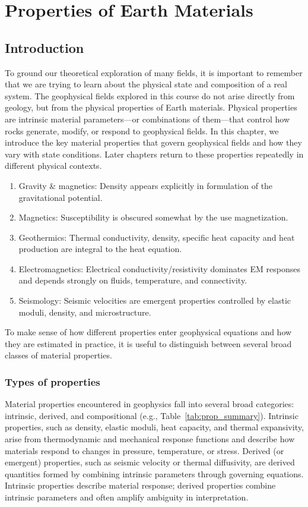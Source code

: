 \chapter{Properties of Earth Materials}\label{ch:physprop}

\section{Introduction}
To ground our theoretical exploration of many fields, it is important to remember that we are trying to learn about the physical state and composition of a real system.  The geophysical fields explored in this course do not arise directly from geology, but from the physical properties of Earth materials.  Physical properties are intrinsic material parameters---or combinations of them---that control how rocks generate, modify, or respond to geophysical fields.  In this chapter, we introduce the key material properties that govern geophysical fields and how they vary with state conditions. Later chapters return to these properties repeatedly in different physical contexts.

\begin{enumerate}
    \item Gravity \& magnetics: Density appears explicitly in formulation of the gravitational potential.
    \item Magnetics: Susceptibility is obscured somewhat by the use magnetization.
    \item Geothermics: Thermal conductivity, density, specific heat capacity and heat production are integral to the heat equation.
    \item Electromagnetics: Electrical conductivity/resistivity dominates EM responses and depends strongly on fluids, temperature, and connectivity.
    \item Seismology: Seismic velocities are emergent properties controlled by elastic moduli, density, and microstructure.
\end{enumerate}

To make sense of how different properties enter geophysical equations and how they are estimated in practice, it is useful to distinguish between several broad classes of material properties.

\subsection{Types of properties}

Material properties encountered in geophysics fall into several broad categories: intrinsic, derived, and compositional (e.g., Table~\ref{tab:prop_summary}). Intrinsic properties, such as density, elastic moduli, heat capacity, and thermal expansivity, arise from thermodynamic and mechanical response functions and describe how materials respond to changes in pressure, temperature, or stress. Derived (or emergent) properties, such as seismic velocity or thermal diffusivity, are derived quantities formed by combining intrinsic parameters through governing equations.  Intrinsic properties describe material response; derived properties combine intrinsic parameters and often amplify ambiguity in interpretation.


